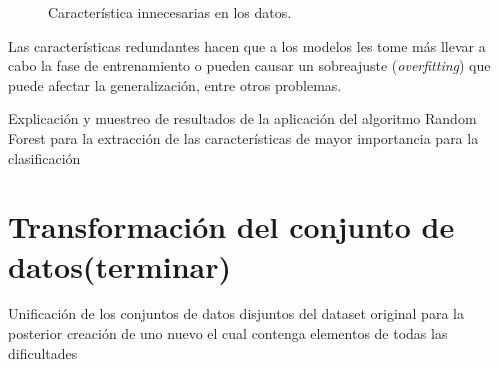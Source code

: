 \begin{figure}[t]
    \centering

    \caption{Característica innecesarias en los datos.}
    \label{fig:redundant}
\end{figure}

Las características redundantes hacen que a los modelos les tome más llevar a cabo la fase de entrenamiento o pueden causar un sobreajuste (\textit{overfitting}) que puede afectar la generalización, entre otros problemas\cite{tuv2009feature}.

Explicación y muestreo de resultados de la aplicación del algoritmo Random Forest para la extracción de las características de mayor importancia para la clasificación

\section{Transformación del conjunto de datos(terminar)}
Unificación de los conjuntos de datos disjuntos del dataset original para la posterior creación de uno nuevo el cual contenga elementos de todas las dificultades

